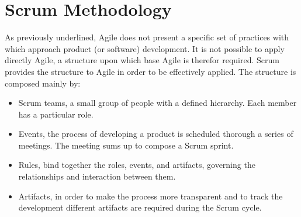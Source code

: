 \documentclass[../main.tex]{subfiles}
\newcommand\connecttw[2]%
  {\draw[->,thick] (#1) -| (#2);
   \draw[->,thick] (#2) -| (#1);
  }
\begin{document}
\section{Scrum Methodology}
As previously underlined, Agile does not present a specific set of practices with which approach product (or software) development. It is not possible to apply directly Agile, a structure upon which base Agile is therefor required. Scrum provides the structure to Agile in order to be effectively applied. The structure is composed mainly by:
\begin{itemize}
    \item Scrum teams, a small group of people with a defined hierarchy. Each member has a particular role. 
    \item Events, the process of developing a product is scheduled thorough a series of meetings. The meeting sums up to compose a Scrum sprint.
    \item Rules, bind together the roles, events, and artifacts, governing the relationships and interaction between them.
    \item Artifacts, in order to make the process more transparent and to track the development different artifacts are required during the Scrum cycle.
\end{itemize}
\end{document}
